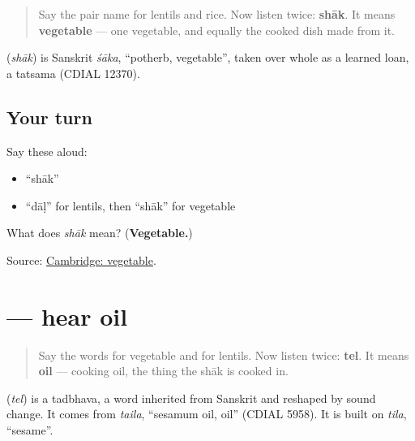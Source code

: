 \label{lesson:GU-C27-hear-shaak}



\begin{quote}
Say the pair name for lentils and rice. Now listen twice: \textbf{shāk}. It means \textbf{vegetable} — one vegetable, and equally the cooked dish made from it.
\end{quote}

\begin{cousinweb}
\textbf{} (\emph{shāk}) is Sanskrit \emph{śāka}, \textquotedblleft{}potherb, vegetable\textquotedblright{}, taken over whole as a learned loan, a tatsama (CDIAL 12370).
\end{cousinweb}

\subsection*{Your turn}
Say these aloud:

\begin{itemize}
\raggedright
  \item \textquotedblleft{}shāk\textquotedblright{}
  \item \textquotedblleft{}dāḷ\textquotedblright{} for lentils, then \textquotedblleft{}shāk\textquotedblright{} for vegetable
\end{itemize}

\begin{tcolorbox}[breakable,colback=teal!4,colframe=teal!35!black,title={Before you move on}]
What does \emph{shāk} mean? (\textbf{Vegetable.})

Source: \href{https://dictionary.cambridge.org/dictionary/english-gujarati/vegetable}{Cambridge: vegetable}.
\end{tcolorbox}
\section[\texorpdfstring{\gu{તેલ} (tel)}{તેલ (tel)}]{ — hear oil}

\label{lesson:GU-C27-hear-tel}



\begin{quote}
Say the words for vegetable and for lentils. Now listen twice: \textbf{tel}. It means \textbf{oil} — cooking oil, the thing the shāk is cooked in.
\end{quote}

\begin{cousinweb}
\textbf{} (\emph{tel}) is a tadbhava, a word inherited from Sanskrit and reshaped by sound change. It comes from \emph{taila}, \textquotedblleft{}sesamum oil, oil\textquotedblright{} (CDIAL 5958). It is built on \emph{tila}, \textquotedblleft{}sesame\textquotedblright{}.
\end{cousinweb}

